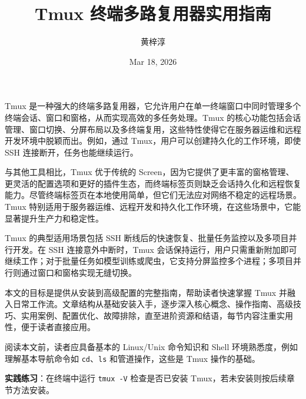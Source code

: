 \title{Tmux 终端多路复用器实用指南}
\author{黄梓淳}
\date{Mar 18, 2026}
\maketitle
Tmux 是一种强大的终端多路复用器，它允许用户在单一终端窗口中同时管理多个终端会话、窗口和窗格，从而实现高效的多任务处理。Tmux 的核心功能包括会话管理、窗口切换、分屏布局以及多终端复用，这些特性使得它在服务器运维和远程开发环境中脱颖而出。例如，通过 Tmux，用户可以创建持久化的工作环境，即使 SSH 连接断开，任务也能继续运行。\par
与其他工具相比，Tmux 优于传统的 Screen，因为它提供了更丰富的窗格管理、更灵活的配置选项和更好的插件生态，而终端标签页则缺乏会话持久化和远程恢复能力。尽管终端标签页在本地使用简单，但它们无法应对网络不稳定的远程场景。Tmux 特别适用于服务器运维、远程开发和持久化工作环境，在这些场景中，它能显著提升生产力和稳定性。\par
Tmux 的典型适用场景包括 SSH 断线后的快速恢复、批量任务监控以及多项目并行开发。在 SSH 连接意外中断时，Tmux 会话保持运行，用户只需重新附加即可继续工作；对于批量任务如模型训练或爬虫，它支持分屏监控多个进程；多项目并行则通过窗口和窗格实现无缝切换。\par
本文的目标是提供从安装到高级配置的完整指南，帮助读者快速掌握 Tmux 并融入日常工作流。文章结构从基础安装入手，逐步深入核心概念、操作指南、高级技巧、实用案例、配置优化、故障排除，直至进阶资源和结语，每节内容注重实用性，便于读者直接应用。\par
阅读本文前，读者应具备基本的 Linux/Unix 命令知识和 Shell 环境熟悉度，例如理解基本导航命令如 \texttt{cd}、\texttt{ls} 和管道操作，这些是 Tmux 操作的基础。\par
\textbf{实践练习}：在终端中运行 \texttt{tmux -V} 检查是否已安装 Tmux，若未安装则按后续章节方法安装。\par
